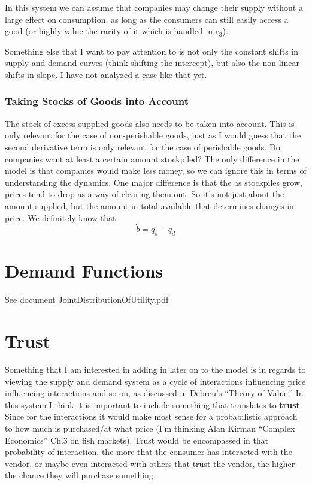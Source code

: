 \documentclass{article}
\begin{document}
In this system we can assume that companies may change their supply without a large effect on consumption, as long as the consumers can still easily access a good (or highly value the rarity of it which is handled in $c_3$).

Something else that I want to pay attention to is not only the constant shifts in supply and demand curves (think shifting the intercept), but also the non-linear shifts in slope. I have not analyzed a case like that yet.

\subsubsection{Taking Stocks of Goods into Account}
The stock of excess supplied goods also needs to be taken into account. This is only relevant for the case of non-perishable goods, just as I would guess that the second derivative term is only relevant for the case of perishable goods. Do companies want at least a certain amount stockpiled? The only difference in the model is that companies would make less money, so we can ignore this in terms of understanding the dynamics. One major difference is that the as stockpiles grow, prices tend to drop as a way of clearing them out. So it's not just about the amount supplied, but the amount in total available that determines changes in price. We definitely know that 
\begin{equation*}
	\dot{b} = q_s - q_d
\end{equation*}



\section{Demand Functions}
See document JointDistributionOfUtility.pdf


\section{Trust}
Something that I am interested in adding in later on to the model is in regards to viewing the supply and demand system as a cycle of interactions influencing price influencing interactions and so on, as discussed in Debreu's ``Theory of Value.'' In this system I think it is important to include something that translates to \textbf{trust}. Since for the interactions it would make most sense for a probabilistic approach to how much is purchased/at what price (I'm thinking Alan Kirman ``Complex Economics'' Ch.3 on fish markets). Trust would be encompassed in that probability of interaction, the more that the consumer has interacted with the vendor, or maybe even interacted with others that trust the vendor, the higher the chance they will purchase something. 
\end{document}
